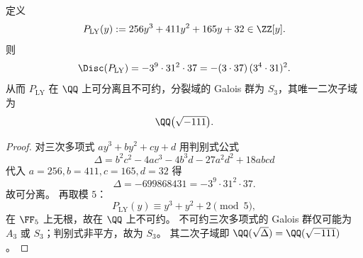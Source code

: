 


\begin{theorem}\label{thm:xi-time-part9g-leyang-cubic-discriminant}
定义
\[
P_{\mathrm{LY}}(y):=256y^3+411y^2+165y+32\in\ZZ[y].
\]
则
\[
\Disc(P_{\mathrm{LY}})
=-3^9\cdot 31^2\cdot 37
=-(3\cdot 37)\,(3^4\cdot 31)^2.
\]
从而 \(P_{\mathrm{LY}}\) 在 \(\QQ\) 上可分离且不可约，分裂域的 Galois 群为 \(S_3\)，其唯一二次子域为
\[
\QQ\bigl(\sqrt{-111}\bigr).
\]
\end{theorem}
\begin{proof}
对三次多项式 \(ay^3+by^2+cy+d\) 用判别式公式
\[
\Delta=b^2c^2-4ac^3-4b^3d-27a^2d^2+18abcd
\]
代入 \(a=256,b=411,c=165,d=32\) 得
\[
\Delta=-699868431=-3^9\cdot 31^2\cdot 37.
\]
故可分离。
再取模 \(5\)：
\[
P_{\mathrm{LY}}(y)\equiv y^3+y^2+2\pmod 5,
\]
在 \(\FF_5\) 上无根，故在 \(\QQ\) 上不可约。
不可约三次多项式的 Galois 群仅可能为 \(A_3\) 或 \(S_3\)；判别式非平方，故为 \(S_3\)。
其二次子域即 \(\QQ(\sqrt{\Delta})=\QQ(\sqrt{-111})\)。
\end{proof}

